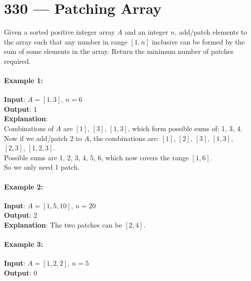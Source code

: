 \section{330 --- Patching Array}
Given a sorted positive integer array $A$ and an integer $ n $, add/patch elements to the array such that any number in range $ [1, n] $ inclusive can be formed by the sum of some elements in the array. Return the minimum number of patches required.

\paragraph{Example 1:}

\begin{flushleft}
\textbf{Input}: $A = [1,3]$, $n = 6$
\\
\textbf{Output}: 1 
\\
\textbf{Explanation}:
\\
Combinations of $A$ are $[1]$, $[3]$, $ [1,3] $, which form possible sums of: 1, 3, 4.
\\
Now if we add/patch 2 to $ A $, the combinations are: $ [1] $, $ [2] $, $ [3] $, $ [1,3] $, $ [2,3] $, $ [1,2,3] $.
\\
Possible sums are 1, 2, 3, 4, 5, 6, which now covers the range $ [1, 6] $.
\\
So we only need 1 patch.
\end{flushleft}

\paragraph{Example 2:}

\begin{flushleft}
\textbf{Input}: $ A = [1,5,10] $, $ n = 20 $
\\
\textbf{Output}: 2
\\
\textbf{Explanation}: The two patches can be $ [2, 4] $.
\end{flushleft}

\paragraph{Example 3:}

\begin{flushleft}
\textbf{Input}: $A = [1,2,2]$, $n = 5$
\\
\textbf{Output}: 0
\end{flushleft}
